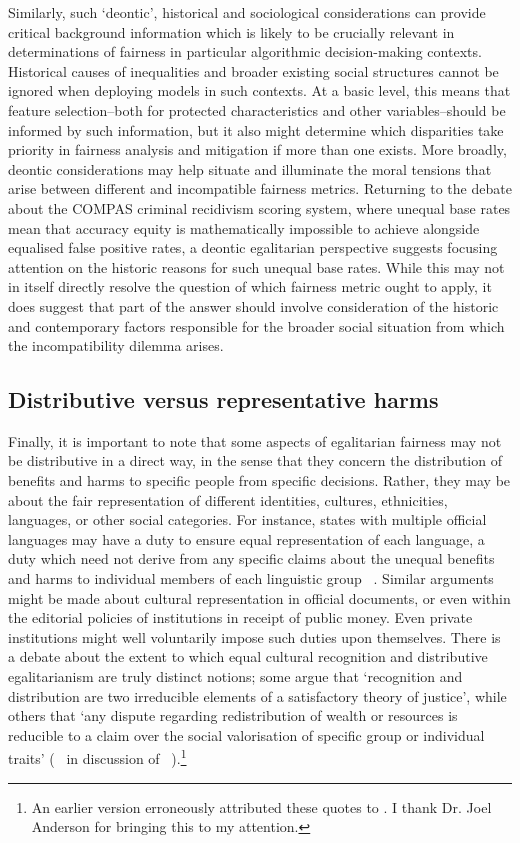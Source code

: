 \documentclass[pmlr,twocolumn,10pt]{jmlr}%
\begin{document}
Similarly, such `deontic', historical and sociological considerations can provide critical background information which is likely to be crucially relevant in determinations of fairness in particular algorithmic decision-making contexts. Historical causes of inequalities and broader existing social structures cannot be ignored when deploying models in such contexts. At a basic level, this means that feature selection--both for protected characteristics and other variables--should be informed by such information, but it also might determine which disparities take priority in fairness analysis and mitigation if more than one exists. More broadly, deontic considerations may help situate and illuminate the moral tensions that arise between different and incompatible fairness metrics. Returning to the debate about the COMPAS criminal recidivism scoring system, where unequal base rates mean that accuracy equity is mathematically impossible to achieve alongside equalised false positive rates, a deontic egalitarian perspective suggests focusing attention on the historic reasons for such unequal base rates. While this may not in itself directly resolve the question of which fairness metric ought to apply, it does suggest that part of the answer should involve consideration of the historic and contemporary factors responsible for the broader social situation from which the incompatibility dilemma arises.

\subsection{Distributive versus representative harms}

Finally, it is important to note that some aspects of egalitarian fairness may not be distributive in a direct way, in the sense that they concern the distribution of benefits and harms to specific people from specific decisions. Rather, they may be about the fair representation of different identities, cultures, ethnicities, languages, or other social categories. For instance, states with multiple official languages may have a duty to ensure equal representation of each language, a duty which need not derive from any specific claims about the unequal benefits and harms to individual members of each linguistic group ~\cite{taylor1994multiculturalism}. Similar arguments might be made about cultural representation in official documents, or even within the editorial policies of institutions in receipt of public money. Even private institutions might well voluntarily impose such duties upon themselves. There is a debate about the extent to which equal cultural recognition and distributive egalitarianism are truly distinct notions; some argue that `recognition and distribution are two irreducible elements of a satisfactory theory of justice', while others that `any dispute regarding redistribution of wealth or resources is reducible to a claim over the social valorisation of specific group or individual traits' (~\cite{mcqueen2011social} in discussion of ~\cite{fraser2003redistribution}).\footnote{An earlier version erroneously attributed these quotes to \cite{fraser2003redistribution}. I thank Dr. Joel Anderson for bringing this to my attention.}
\end{document}
